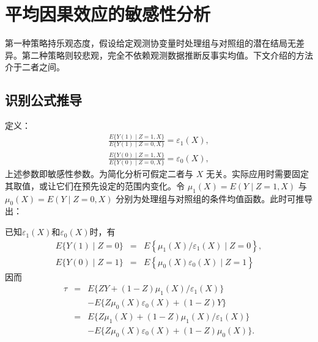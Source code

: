  
\section{平均因果效应的敏感性分析}


 
第一种策略持乐观态度，假设给定观测协变量时处理组与对照组的潜在结局无差异。第二种策略则较悲观，完全不依赖观测数据推断反事实均值。下文介绍的方法介于二者之间。 



\subsection{识别公式推导}

定义：
\begin{eqnarray*}
\frac{ E\{ Y(1)\mid Z=1, X \} }{ E\{ Y(1)\mid Z=0, X \} } = \varepsilon_1(X), \\
\frac{ E\{ Y(0)\mid Z=1, X \} }{ E\{ Y(0)\mid Z=0, X \} } = \varepsilon_0(X) ,
\end{eqnarray*}
上述参数即敏感性参数。为简化分析可假定二者与 $X$ 无关。实际应用时需要固定其取值，或让它们在预先设定的范围内变化。令 $\mu_1(X) = E(Y\mid Z=1, X)$ 与 $\mu_0(X) = E(Y\mid Z=0, X)$ 分别为处理组与对照组的条件均值函数。此时可推导出：

\begin{theorem}
\label{thm::outcome-reg-sensitivity}
已知$\varepsilon_1(X)$和$ \varepsilon_0(X) $时，有
\begin{eqnarray*}
E\{ Y(1)\mid Z=0 \}   &=& E\left\{\mu_1(X)   / \varepsilon_1(X)  \mid Z=0\right\},\\ 
E\{ Y(0)\mid Z=1 \}   &=& E\left\{\mu_0(X)    \varepsilon_0(X)  \mid Z=1\right\}
\end{eqnarray*}
因而
\begin{eqnarray}
\tau & = & E\{ ZY + (1-Z) \mu_1(X)   / \varepsilon_1(X)\}  \nonumber  \\
 && - E\{ Z \mu_0(X)    \varepsilon_0(X) + (1-Z)Y\}  \label{eq::predictive}\\
& = & E\{ Z \mu_1(X) + (1-Z) \mu_1(X)   / \varepsilon_1(X)\}  \nonumber \\
&&- E\{ Z \mu_0(X)    \varepsilon_0(X) + (1-Z) \mu_0(X)\}. \label{eq::projective}
\end{eqnarray}
\end{theorem}


 


